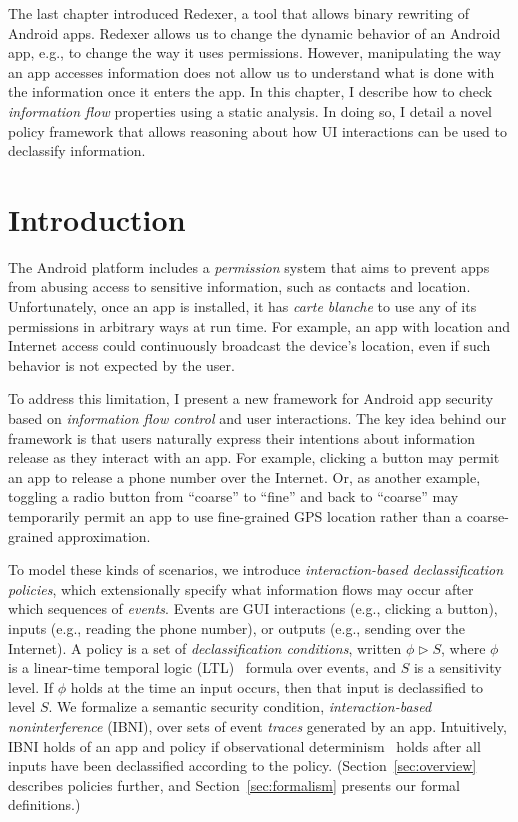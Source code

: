 The last chapter introduced Redexer, a tool that allows binary
rewriting of Android apps. Redexer allows us to change the dynamic
behavior of an Android app, e.g., to change the way it uses
permissions. However, manipulating the way an app accesses information
does not allow us to understand what is done with the information once
it enters the app. In this chapter, I describe how to check
\emph{information flow} properties using a static analysis. In doing
so, I detail a novel policy framework that allows reasoning about how
UI interactions can be used to declassify information.

\section{Introduction}
\label{sec:introduction}

The Android platform includes a \emph{permission} system that aims to
prevent apps from abusing access to sensitive information, such as
contacts and location. Unfortunately, once an app is installed, it has
\emph{carte blanche} to use any of its permissions in arbitrary ways
at run time. For example, an app with location and Internet access
could continuously broadcast the device's location, even if such
behavior is not expected by the user.

To address this limitation, I present a new framework for Android app
security based on \emph{information flow control} \cite{Denning:1975}
and user interactions.  The key idea behind our framework is that
users naturally express their intentions about information release as
they interact with an app.  For example, clicking a button may permit
an app to release a phone number over the Internet. Or, as another
example, toggling a radio button from ``coarse'' to ``fine'' and back
to ``coarse'' may temporarily permit an app to use fine-grained GPS
location rather than a coarse-grained approximation.

To model these kinds of scenarios, we introduce
\emph{interaction-based declassification policies}, which
extensionally specify what information flows may occur after which
sequences of \emph{events}.  Events are GUI interactions (e.g.,
clicking a button), inputs (e.g., reading
the phone number), or outputs (e.g., sending over the Internet).
A policy is a set of \emph{declassification conditions}, written
$\phi \mathrel\rhd S$, where $\phi$ is a linear-time temporal logic
(LTL)~\cite{Pnueli:1977} formula over events, and $S$ is a sensitivity
level.  If $\phi$ holds at the time an input occurs, then that input
is declassified to level $S$. 
We formalize a semantic security condition,
\emph{interaction-based noninterference} (IBNI), over sets of event
\emph{traces} generated by an app.  Intuitively, IBNI holds of an app
and policy if observational
determinism~\cite{Zdancewic:03} holds after all inputs have been
declassified according to the policy. 
(Section~\ref{sec:overview}
describes policies further, and Section~\ref{sec:formalism} presents
our formal definitions.)

